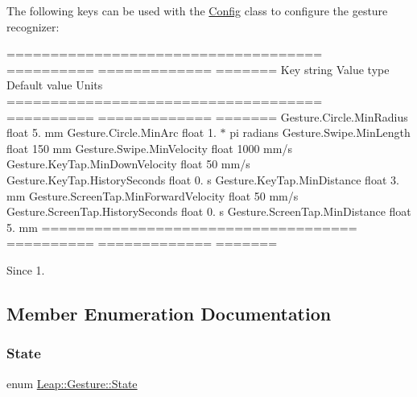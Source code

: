 The following keys can be used with the \hyperlink{class_leap_1_1_config}{Config} class to configure the gesture recognizer\+:

==================================== ========== ============= ======= Key string Value type Default value Units ==================================== ========== ============= ======= Gesture.\+Circle.\+Min\+Radius float 5. mm Gesture.\+Circle.\+Min\+Arc float 1. $\ast$ pi radians Gesture.\+Swipe.\+Min\+Length float 150 mm Gesture.\+Swipe.\+Min\+Velocity float 1000 mm/s Gesture.\+Key\+Tap.\+Min\+Down\+Velocity float 50 mm/s Gesture.\+Key\+Tap.\+History\+Seconds float 0. s Gesture.\+Key\+Tap.\+Min\+Distance float 3. mm Gesture.\+Screen\+Tap.\+Min\+Forward\+Velocity float 50 mm/s Gesture.\+Screen\+Tap.\+History\+Seconds float 0. s Gesture.\+Screen\+Tap.\+Min\+Distance float 5. mm ==================================== ========== ============= ======= 

\begin{DoxySince}{Since}
1. 
\end{DoxySince}


\subsection{Member Enumeration Documentation}
\mbox{\label{class_leap_1_1_gesture_a068c6f3ba05970dc557b62a366073578}} 
\subsubsection{\texorpdfstring{State}{State}}
{\footnotesize\ttfamily enum \hyperlink{class_leap_1_1_gesture_a068c6f3ba05970dc557b62a366073578}{Leap\+::\+Gesture\+::\+State}}

